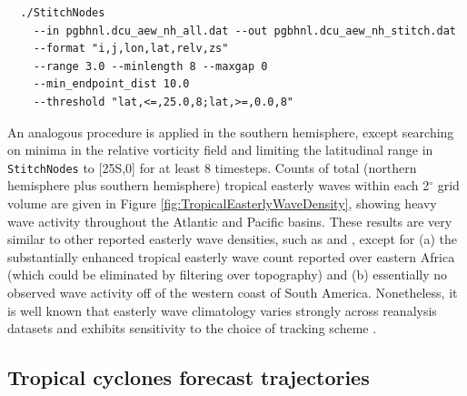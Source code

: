 \documentclass[gmdd, hvmath]{copernicus}
\begin{document}
{\small \begin{verbatim}
  ./StitchNodes
    --in pgbhnl.dcu_aew_nh_all.dat --out pgbhnl.dcu_aew_nh_stitch.dat
    --format "i,j,lon,lat,relv,zs"
    --range 3.0 --minlength 8 --maxgap 0
    --min_endpoint_dist 10.0
    --threshold "lat,<=,25.0,8;lat,>=,0.0,8"
\end{verbatim}}

An analogous procedure is applied in the southern hemisphere, except searching on minima in the relative vorticity field and limiting the latitudinal range in \texttt{StitchNodes} to [25S,0] for at least 8 timesteps.  Counts of total (northern hemisphere plus southern hemisphere) tropical easterly waves within each 2$^\circ$ grid volume are given in Figure \ref{fig:TropicalEasterlyWaveDensity}, showing heavy wave activity throughout the Atlantic and Pacific basins.  These results are very similar to other reported easterly wave densities, such as \cite{belanger2014african} and \cite{thorncroft2001african}, except for (a) the substantially enhanced tropical easterly wave count reported over eastern Africa (which could be eliminated by filtering over topography) and (b) essentially no observed wave activity off of the western coast of South America.  Nonetheless, it is well known that easterly wave climatology varies strongly across reanalysis datasets and exhibits sensitivity to the choice of tracking scheme \citep{hodges2003comparison}.


\subsection{Tropical cyclones forecast trajectories} \label{sec:TropicalCycloneForecast}
\end{document}

